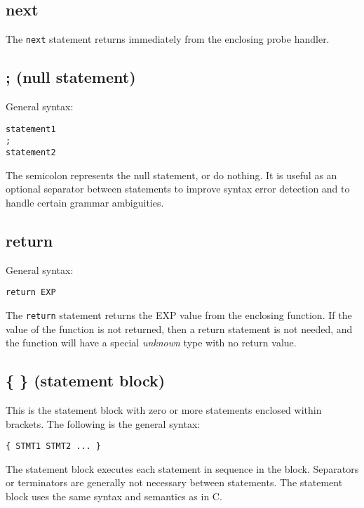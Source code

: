 \documentclass[twoside,english]{article}
\newenvironment{vindent}
{\begin{list}{}{\setlength{\listparindent}{6pt}}
\item[]}
{\end{list}}
\begin{document}
\subsection{next}
The \texttt{next} statement returns immediately from the enclosing probe
handler.


\subsection{; (null statement)}
\index{;}
General syntax:

\begin{vindent}
\begin{verbatim}
statement1
;
statement2
\end{verbatim}
\end{vindent}
The semicolon represents the null statement, or do nothing. It is useful
as an optional separator between statements to improve syntax error detection
and to handle certain grammar ambiguities.


\subsection{return}
General syntax:

\begin{vindent}
\begin{verbatim}
return EXP
\end{verbatim}
\end{vindent}
The \texttt{return} statement returns the EXP value from the enclosing function.
If the value of the function is not returned, then a return statement is
not needed, and the function will have a special \emph{unknown} type with
no return value.

\subsection{\{ \} (statement block)}
\index{\{ \}}
This is the statement block with zero or more statements enclosed within
brackets. The following is the general syntax:

\begin{vindent}
\begin{verbatim}
{ STMT1 STMT2 ... }
\end{verbatim}
\end{vindent}
The statement block executes each statement in sequence in the block. Separators
or terminators are generally not necessary between statements. The statement
block uses the same syntax and semantics as in C.
\end{document}
